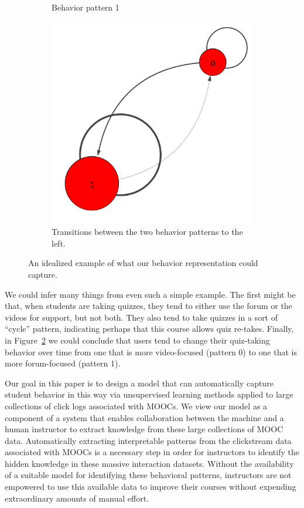 \begin{figure}
\begin{subfigure}[t]{0.30\textwidth}
    \caption{Behavior pattern 1\label{fig:motivating-example-1}}
  \end{subfigure}
  \begin{subfigure}[t]{0.30\textwidth}
    \includegraphics[width=\textwidth]{figures/example/trans.png}
    \caption{Transitions between the two behavior patterns to the
    left.\label{fig:motivating-example-trans}}
  \end{subfigure}
  \caption{An idealized example of what our behavior representation could capture.}
  \label{fig:motivating-example}
\end{figure}
We could infer many things from even such a simple example. The first might
be that, when students are taking quizzes, they tend to either use the
forum or the videos for support, but not both. They also tend to take
quizzes in a sort of ``cycle'' pattern, indicating perhaps that this course
allows quiz re-takes. Finally, in Figure~\ref{fig:motivating-example-trans}
we could conclude that users tend to change their quiz-taking behavior over
time from one that is more video-focused (pattern 0) to one that is more
forum-focused (pattern 1).

Our goal in this paper is to design a model that can automatically capture
student behavior in this way via unsupervised learning methods applied to
large collections of click logs associated with MOOCs. We view our model
as a component of a system that enables collaboration between the machine
and a human instructor to extract knowledge from these large collections of
MOOC data. Automatically extracting interpretable patterns from the
clickstream data associated with MOOCs is a necessary step in order for
instructors to identify the hidden knowledge in these massive interaction
datasets. Without the availability of a suitable model for identifying
these behavioral patterns, instructors are not empowered to use this
available data to improve their courses without expending extraordinary
amounts of manual effort.

